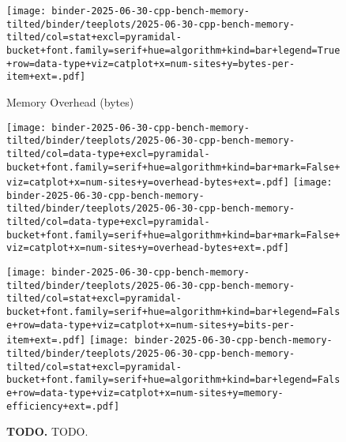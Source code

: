 \begin{figure}


\centering
\texttt{[image: binder-2025-06-30-cpp-bench-memory-tilted/binder/teeplots/2025-06-30-cpp-bench-memory-tilted/col=stat+excl=pyramidal-bucket+font.family=serif+hue=algorithm+kind=bar+legend=True+row=data-type+viz=catplot+x=num-sites+y=bytes-per-item+ext=.pdf]}

\vspace{1ex}

{\small Memory Overhead (bytes)\phantom{422}}

\vspace{1ex}

\hspace{-1ex}%
\texttt{[image: binder-2025-06-30-cpp-bench-memory-tilted/binder/teeplots/2025-06-30-cpp-bench-memory-tilted/col=data-type+excl=pyramidal-bucket+font.family=serif+hue=algorithm+kind=bar+mark=False+viz=catplot+x=num-sites+y=overhead-bytes+ext=.pdf]}%
\hspace{-0.5ex}%
\texttt{[image: binder-2025-06-30-cpp-bench-memory-tilted/binder/teeplots/2025-06-30-cpp-bench-memory-tilted/col=data-type+excl=pyramidal-bucket+font.family=serif+hue=algorithm+kind=bar+mark=False+viz=catplot+x=num-sites+y=overhead-bytes+ext=.pdf]}

\vspace{1.1ex}

\texttt{[image: binder-2025-06-30-cpp-bench-memory-tilted/binder/teeplots/2025-06-30-cpp-bench-memory-tilted/col=stat+excl=pyramidal-bucket+font.family=serif+hue=algorithm+kind=bar+legend=False+row=data-type+viz=catplot+x=num-sites+y=bits-per-item+ext=.pdf]}%
\texttt{[image: binder-2025-06-30-cpp-bench-memory-tilted/binder/teeplots/2025-06-30-cpp-bench-memory-tilted/col=stat+excl=pyramidal-bucket+font.family=serif+hue=algorithm+kind=bar+legend=False+row=data-type+viz=catplot+x=num-sites+y=memory-efficiency+ext=.pdf]}

\vspace{-2ex}

\caption{%
\textbf{TODO.}
\small
TODO.
}
\label{fig:memory}
\end{figure}

